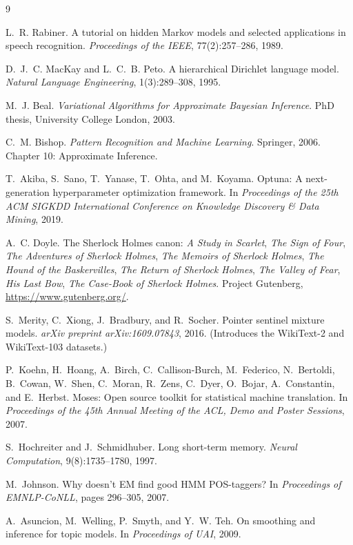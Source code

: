 \documentclass[11pt]{article}
\begin{document}
\begin{thebibliography}{9}

L.~R. Rabiner.
\newblock A tutorial on hidden Markov models and selected applications in speech recognition.
\newblock \emph{Proceedings of the IEEE}, 77(2):257--286, 1989.

D.~J.~C. MacKay and L.~C.~B. Peto.
\newblock A hierarchical Dirichlet language model.
\newblock \emph{Natural Language Engineering}, 1(3):289--308, 1995.

M.~J. Beal.
\newblock \emph{Variational Algorithms for Approximate Bayesian Inference}.
\newblock PhD thesis, University College London, 2003.

C.~M. Bishop.
\newblock \emph{Pattern Recognition and Machine Learning}.
\newblock Springer, 2006. Chapter 10: Approximate Inference.

T.~Akiba, S.~Sano, T.~Yanase, T.~Ohta, and M.~Koyama.
\newblock Optuna: A next-generation hyperparameter optimization framework.
\newblock In \emph{Proceedings of the 25th ACM SIGKDD International Conference on Knowledge Discovery \& Data Mining}, 2019.

A.~C. Doyle.
\newblock The Sherlock Holmes canon: \emph{A Study in Scarlet}, \emph{The Sign of Four},
\emph{The Adventures of Sherlock Holmes}, \emph{The Memoirs of Sherlock Holmes},
\emph{The Hound of the Baskervilles}, \emph{The Return of Sherlock Holmes},
\emph{The Valley of Fear}, \emph{His Last Bow}, \emph{The Case-Book of Sherlock Holmes}.
\newblock Project Gutenberg, \url{https://www.gutenberg.org/}.

S.~Merity, C.~Xiong, J.~Bradbury, and R.~Socher.
\newblock Pointer sentinel mixture models.
\newblock \emph{arXiv preprint arXiv:1609.07843}, 2016.
(Introduces the WikiText-2 and WikiText-103 datasets.)

P.~Koehn, H.~Hoang, A.~Birch, C.~Callison-Burch, M.~Federico, N.~Bertoldi, B.~Cowan,
W.~Shen, C.~Moran, R.~Zens, C.~Dyer, O.~Bojar, A.~Constantin, and E.~Herbst.
\newblock Moses: Open source toolkit for statistical machine translation.
\newblock In \emph{Proceedings of the 45th Annual Meeting of the ACL, Demo and Poster Sessions}, 2007.

S.~Hochreiter and J.~Schmidhuber.
\newblock Long short-term memory.
\newblock \emph{Neural Computation}, 9(8):1735--1780, 1997.

M.~Johnson.
\newblock Why doesn't EM find good HMM POS-taggers?
\newblock In \emph{Proceedings of EMNLP-CoNLL}, pages 296--305, 2007.

A.~Asuncion, M.~Welling, P.~Smyth, and Y.~W. Teh.
\newblock On smoothing and inference for topic models.
\newblock In \emph{Proceedings of UAI}, 2009.
\end{thebibliography}
\end{document}
